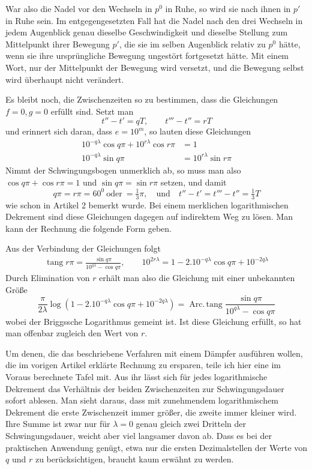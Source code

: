 War also die Nadel vor den Wechseln in $p^0$ in Ruhe, so wird sie nach ihnen in $p'$ in Ruhe sein. Im entgegengesetzten Fall hat die Nadel nach den drei Wechseln in jedem Augenblick genau dieselbe Geschwindigkeit und dieselbe Stellung zum Mittelpunkt ihrer Bewegung $p'$, die sie im selben Augenblick relativ zu $p^0$ hätte, wenn sie ihre ursprüngliche Bewegung ungestört fortgesetzt hätte. Mit einem Wort, nur der Mittelpunkt der Bewegung wird versetzt, und die Bewegung selbst wird überhaupt nicht verändert.

Es bleibt noch, die Zwischenzeiten so zu bestimmen, dass die Gleichungen $f=0,g=0$ erfüllt sind. Setzt man
\[
t''-t'=qT,\qquad t'''-t''=rT
\]
und erinnert sich daran, dass $e=10^m$, so lauten diese Gleichungen
\[
\begin{aligned}
10^{-q\lambda}\cos q\pi+10^{r\lambda}\cos r\pi&=1\\
10^{-q\lambda}\sin q\pi&=10^{r\lambda}\sin r\pi
\end{aligned}
\]
Nimmt der Schwingungsbogen unmerklich ab, so muss man also $\cos q\pi+\cos r\pi=1$ und $\sin q\pi=\sin r\pi$ setzen, und damit
\[
q\pi=r\pi=60^0\ \text{oder}\ =\tfrac{1}{3}\pi,\quad\text{und}\quad t''-t'=t'''-t''=\tfrac{1}{3}T
\]
wie schon in Artikel 2 bemerkt wurde. Bei einem merklichen logarithmischen Dekrement sind diese Gleichungen dagegen auf indirektem Weg zu lösen. Man kann der Rechnung die folgende Form geben.

Aus der Verbindung der Gleichungen folgt
\[
\begin{gathered}
\operatorname{tang}r\pi=\frac{\sin q\pi}{10^{q\lambda}-\cos q\pi},\qquad
10^{2r\lambda}=1-2.10^{-q\lambda}\cos q\pi+10^{-2q\lambda}
\end{gathered}
\]
Durch Elimination von $r$ erhält man also die Gleichung mit einer unbekannten Größe
\[
\frac{\pi}{2\lambda}\log(1-2.10^{-q\lambda}\cos q\pi+10^{-2q\lambda})=\operatorname{Arc.\,tang}\frac{\sin q\pi}{10^{q\lambda}-\cos q\pi}
\]
wobei der Briggssche Logarithmus gemeint ist. Ist diese Gleichung erfüllt, so hat man offenbar zugleich den Wert von $r$.

Um denen, die das beschriebene Verfahren mit einem Dämpfer ausführen wollen, die im vorigen Artikel erklärte Rechnung zu ersparen, teile ich hier eine im Voraus berechnete Tafel mit. Aus ihr lässt sich für jedes logarithmische Dekrement das Verhältnis der beiden Zwischenzeiten zur Schwingungsdauer sofort ablesen. Man sieht daraus, dass mit zunehmendem logarithmischem Dekrement die erste Zwischenzeit immer größer, die zweite immer kleiner wird. Ihre Summe ist zwar nur für $\lambda=0$ genau gleich zwei Dritteln der Schwingungsdauer, weicht aber viel langsamer davon ab. Dass es bei der praktischen Anwendung genügt, etwa nur die ersten Dezimalstellen der Werte von $q$ und $r$ zu berücksichtigen, braucht kaum erwähnt zu werden.

